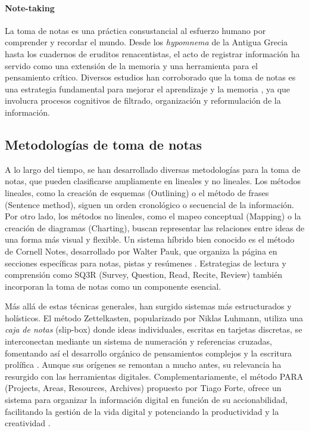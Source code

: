 \paragraph{Note-taking}
La toma de notas es una práctica consustancial al esfuerzo humano por comprender y recordar el mundo. Desde los \textit{hypomnema} de la Antigua Grecia hasta los cuadernos de eruditos renacentistas, el acto de registrar información ha servido como una extensión de la memoria y una herramienta para el pensamiento crítico. Diversos estudios han corroborado que la toma de notas es una estrategia fundamental para mejorar el aprendizaje y la memoria \citep{jansenIntegrativeReviewCognitive2017}, ya que involucra procesos cognitivos de filtrado, organización y reformulación de la información.

\subsection{Metodologías de toma de notas}
\label{subsec:metodologias_toma_notas}

A lo largo del tiempo, se han desarrollado diversas metodologías para la toma de notas, que pueden clasificarse ampliamente en lineales y no lineales. Los métodos lineales, como la creación de esquemas (Outlining) o el método de frases (Sentence method), siguen un orden cronológico o secuencial de la información. Por otro lado, los métodos no lineales, como el mapeo conceptual (Mapping) o la creación de diagramas (Charting), buscan representar las relaciones entre ideas de una forma más visual y flexible. Un sistema híbrido bien conocido es el método de Cornell Notes, desarrollado por Walter Pauk, que organiza la página en secciones específicas para notas, pistas y resúmenes \citep{paukHowStudyCollege2010}. Estrategias de lectura y comprensión como SQ3R (Survey, Question, Read, Recite, Review) también incorporan la toma de notas como un componente esencial.

Más allá de estas técnicas generales, han surgido sistemas más estructurados y holísticos. El método Zettelkasten, popularizado por Niklas Luhmann, utiliza una \textit{caja de notas} (slip-box) donde ideas individuales, escritas en tarjetas discretas, se interconectan mediante un sistema de numeración y referencias cruzadas, fomentando así el desarrollo orgánico de pensamientos complejos y la escritura prolífica \citep{ahrensHowTakeSmart2017}. Aunque sus orígenes se remontan a mucho antes, su relevancia ha resurgido con las herramientas digitales. Complementariamente, el método PARA (Projects, Areas, Resources, Archives) propuesto por Tiago Forte, ofrece un sistema para organizar la información digital en función de su accionabilidad, facilitando la gestión de la vida digital y potenciando la productividad y la creatividad \citep{forteBuildingSecondBrain2022}.

